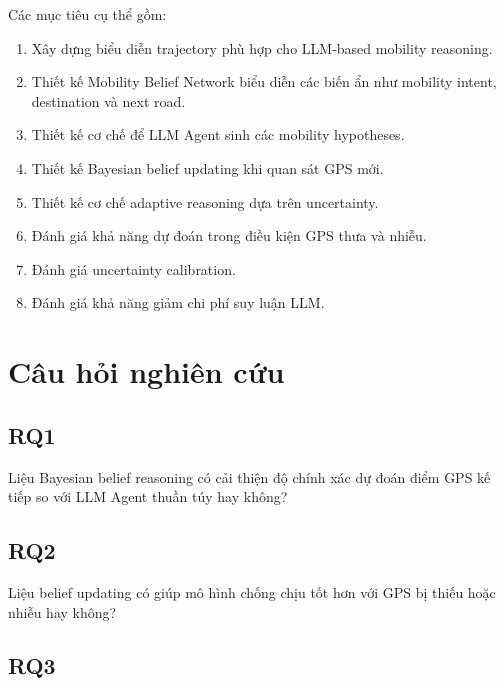 \documentclass[11pt,a4paper]{article}
\begin{document}
	Các mục tiêu cụ thể gồm:
	
	\begin{enumerate}
		
		\item
		Xây dựng biểu diễn trajectory phù hợp cho LLM-based mobility reasoning.
		
		\item
		Thiết kế Mobility Belief Network biểu diễn các biến ẩn như mobility
		intent, destination và next road.
		
		\item
		Thiết kế cơ chế để LLM Agent sinh các mobility hypotheses.
		
		\item
		Thiết kế Bayesian belief updating khi quan sát GPS mới.
		
		\item
		Thiết kế cơ chế adaptive reasoning dựa trên uncertainty.
		
		\item
		Đánh giá khả năng dự đoán trong điều kiện GPS thưa và nhiễu.
		
		\item
		Đánh giá uncertainty calibration.
		
		\item
		Đánh giá khả năng giảm chi phí suy luận LLM.
		
	\end{enumerate}
	
	\section{Câu hỏi nghiên cứu}
	
	\subsection{RQ1}
	
	Liệu Bayesian belief reasoning có cải thiện độ chính xác dự đoán điểm
	GPS kế tiếp so với LLM Agent thuần túy hay không?
	
	\subsection{RQ2}
	
	Liệu belief updating có giúp mô hình chống chịu tốt hơn với GPS bị thiếu
	hoặc nhiễu hay không?
	
	\subsection{RQ3}
	
\end{document}
